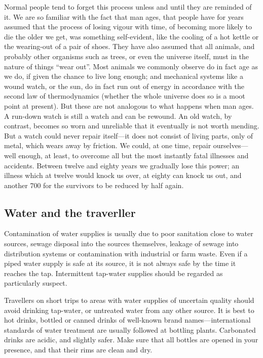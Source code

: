 \documentclass[11pt]{article}
\begin{document}
Normal people tend to forget this process unless and until they are reminded of it. We are so familiar with the fact that man ages, that people have for years assumed that the process of losing vigour with time, of becoming more likely to die the older we get, was something self-evident, like the cooling of a hot kettle or the wearing-out of a pair of shoes. They have also assumed that all animals, and probably other organisms such as trees, or even the universe itself, must in the nature of things ``wear out''. Most animals we commonly observe do in fact age as we do, if given the chance to live long enough; and mechanical systems like a wound watch, or the sun, do in fact run out of energy in accordance with the second law of thermodynamics (whether the whole universe does so is a moot point at present). But these are not analogous to what happens when man ages. A run-down watch is still a watch and can be rewound. An old watch, by contrast, becomes so worn and unreliable that it eventually is not worth mending. But a watch could never repair itself---it does not consist of living parts, only of metal, which wears away by friction. We could, at one time, repair ourselves---well enough, at least, to overcome all but the most instantly fatal illnesses and accidents. Between twelve and eighty years we gradually lose this power; an illness which at twelve would knock us over, at eighty can knock us out, and another 700 for the survivors to be reduced by half again.
\subsection{Water and the traverller}
\label{sec-2-38}


Contamination of water supplies is usually due to poor sanitation close to water sources, sewage disposal into the sources themselves, leakage of sewage into distribution systems or contamination with industrial or farm waste. Even if a piped water supply is safe at its source, it is not always safe by the time it reaches the tap. Intermittent tap-water supplies should be regarded as particularly suspect.

Travellers on short trips to areas with water supplies of uncertain quality should avoid drinking tap-water, or untreated water from any other source. It is best to hot drinks, bottled or canned drinks of well-known brand names---international standards of water treatment are usually followed at bottling plants. Carbonated drinks are acidic, and slightly safer. Make sure that all bottles are opened in your presence, and that their rims are clean and dry.
\end{document}

